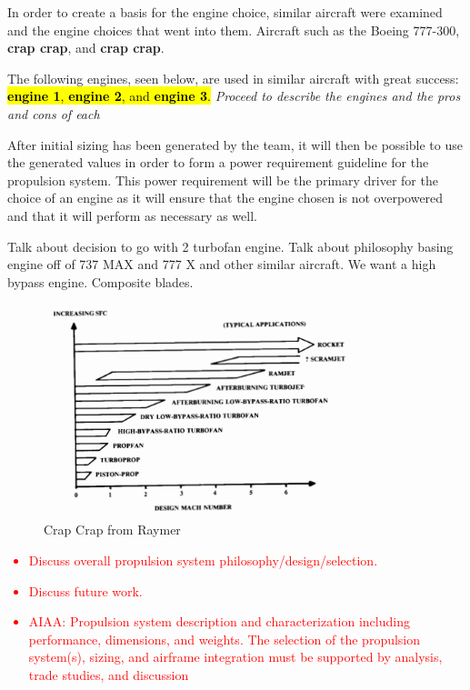 In order to create a basis for the engine choice, similar aircraft were examined and the engine choices that went into them. Aircraft such as the Boeing 777-300, \textbf{crap crap}, and \textbf{crap crap}.

The following engines, seen below, are used in similar aircraft with great success: \hl{\textbf{engine 1}, \textbf{engine 2}, and \textbf{engine 3}.} \textit{Proceed to describe the engines and the pros and cons of each}

After initial sizing has been generated by the team, it will then be possible to use the generated values in order to form a power requirement guideline for the propulsion system. This power requirement will be the primary driver for the choice of an engine as it will ensure that the engine chosen is not overpowered and that it will perform as necessary as well.  

Talk about decision to go with 2 turbofan engine. Talk about philosophy basing engine off of 737 MAX and 777 X and other similar aircraft. We want a high bypass engine. Composite blades.

\begin{figure} [h!]
    \centering
    \includegraphics[width=0.8\textwidth]{Photos/PropSelection.PNG}
    \caption{Crap Crap from Raymer}
    \label{PropSelection}
\end{figure}


\textcolor{red}{
\begin{itemize}
    \item Discuss overall propulsion system philosophy/design/selection.
    \item Discuss future work.
    \item AIAA: Propulsion system description and characterization including performance,
    dimensions, and weights. The selection of the propulsion system(s), sizing, and
    airframe integration must be supported by analysis, trade studies, and discussion
\end{itemize}}